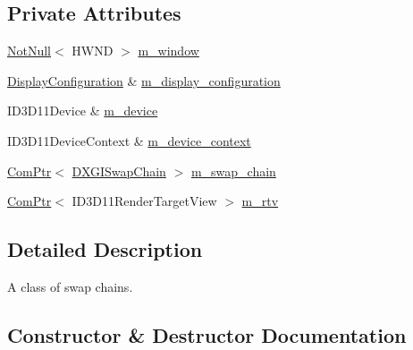 \subsection*{Private Attributes}
\begin{DoxyCompactItemize}
\item 
\mbox{\hyperlink{namespacemage_a8769f9d670d6b585ea306cb1062af94b}{Not\+Null}}$<$ H\+W\+ND $>$ \mbox{\hyperlink{classmage_1_1rendering_1_1_swap_chain_1_1_impl_a56b2c79926ed4c86de9b0cd45e0cdabd}{m\+\_\+window}}
\item 
\mbox{\hyperlink{classmage_1_1rendering_1_1_display_configuration}{Display\+Configuration}} \& \mbox{\hyperlink{classmage_1_1rendering_1_1_swap_chain_1_1_impl_a8acbe60edb384725707d9b393790293f}{m\+\_\+display\+\_\+configuration}}
\item 
I\+D3\+D11\+Device \& \mbox{\hyperlink{classmage_1_1rendering_1_1_swap_chain_1_1_impl_a6eff2673925babbd6dd9226dd07bf941}{m\+\_\+device}}
\item 
I\+D3\+D11\+Device\+Context \& \mbox{\hyperlink{classmage_1_1rendering_1_1_swap_chain_1_1_impl_aead0bec9edcee29c39a264dc9ea43780}{m\+\_\+device\+\_\+context}}
\item 
\mbox{\hyperlink{namespacemage_ae74f374780900893caa5555d1031fd79}{Com\+Ptr}}$<$ \mbox{\hyperlink{namespacemage_1_1rendering_a739d2b0d24b44bcfb16903df756fedf6}{D\+X\+G\+I\+Swap\+Chain}} $>$ \mbox{\hyperlink{classmage_1_1rendering_1_1_swap_chain_1_1_impl_aced5e9cea58432f63e62f133def982c9}{m\+\_\+swap\+\_\+chain}}
\item 
\mbox{\hyperlink{namespacemage_ae74f374780900893caa5555d1031fd79}{Com\+Ptr}}$<$ I\+D3\+D11\+Render\+Target\+View $>$ \mbox{\hyperlink{classmage_1_1rendering_1_1_swap_chain_1_1_impl_a7ee01074ddbc2665e8b06f61a5eb3528}{m\+\_\+rtv}}
\end{DoxyCompactItemize}


\subsection{Detailed Description}
A class of swap chains. 

\subsection{Constructor \& Destructor Documentation}
\mbox{\label{classmage_1_1rendering_1_1_swap_chain_1_1_impl_a9631b95d63626a41575ca18aa6dec206}} 
